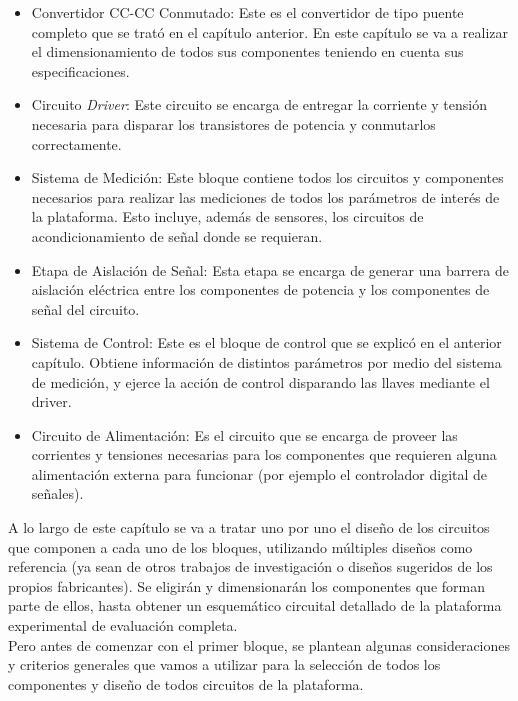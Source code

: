 \begin{itemize}
    \item {\SemiBold Convertidor CC-CC Conmutado:} Este es el convertidor de tipo puente completo que se trató en el capítulo anterior. En este capítulo se va a realizar el dimensionamiento de todos sus componentes teniendo en cuenta sus especificaciones. 
    \item {\SemiBold Circuito \textit{Driver}:} Este circuito se encarga de entregar la corriente y tensión necesaria para disparar los transistores de potencia y conmutarlos correctamente.
    \item {\SemiBold Sistema de Medición:} Este bloque contiene todos los circuitos y componentes necesarios para realizar las mediciones de todos los parámetros de interés de la plataforma. Esto incluye, además de sensores, los circuitos de acondicionamiento de señal donde se requieran.
    \item {\SemiBold Etapa de Aislación de Señal:} Esta etapa se encarga de generar una barrera de aislación eléctrica entre los componentes de potencia y los componentes de señal del circuito.
    \item {\SemiBold Sistema de Control:} Este es el bloque de control que se explicó en el anterior capítulo. Obtiene información de distintos parámetros por medio del sistema de medición, y ejerce la acción de control disparando las llaves mediante el driver.
    \item {\SemiBold Circuito de Alimentación:} Es el circuito que se encarga de proveer las corrientes y tensiones necesarias para los componentes que requieren alguna alimentación externa para funcionar (por ejemplo el controlador digital de señales).\\
\end{itemize}

A lo largo de este capítulo se va a tratar uno por uno el diseño de los circuitos que componen a cada uno de los bloques, utilizando múltiples diseños como referencia (ya sean de otros trabajos de investigación o diseños sugeridos de los propios fabricantes). Se eligirán y dimensionarán los componentes que forman parte de ellos, hasta obtener un esquemático circuital detallado de la plataforma experimental de evaluación completa.\\

Pero antes de comenzar con el primer bloque, se plantean algunas consideraciones y criterios generales que vamos a utilizar para la selección de todos los componentes y diseño de todos circuitos de la plataforma.\\

